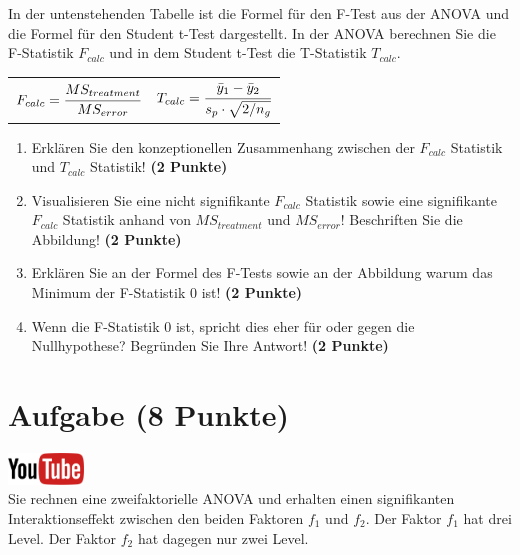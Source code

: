 \documentclass[a4paper, 9pt]{scrartcl}\usepackage[]{graphicx}\usepackage[]{xcolor}
\begin{document}
In der untenstehenden Tabelle ist die Formel f{\"u}r den F-Test aus der ANOVA
und die Formel f{\"u}r den Student t-Test dargestellt. In der ANOVA berechnen
Sie die F-Statistik $F_{calc}$ und in dem Student t-Test die T-Statistik
$T_{calc}$.

\begin{center}
  \begin{tabular}{cc}
    $F_{calc} = \cfrac{MS_{treatment}}{MS_{error}}$ & $T_{calc} = \cfrac{\bar{y}_1 - \bar{y}_2}{s_p \cdot \sqrt{2/n_g}}$\\
  \end{tabular}
\end{center}


\begin{enumerate}
\item Erkl{\"a}ren Sie den konzeptionellen Zusammenhang zwischen der $F_{calc}$
  Statistik und $T_{calc}$ Statistik! \textbf{(2 Punkte)}
\item Visualisieren Sie eine nicht signifikante $F_{calc}$ Statistik sowie
  eine signifikante $F_{calc}$ Statistik anhand von $MS_{treatment}$ und
  $MS_{error}$! Beschriften Sie die Abbildung! \textbf{(2 Punkte)}
\item Erkl{\"a}ren Sie an der Formel des F-Tests sowie an der Abbildung warum
  das Minimum der F-Statistik 0 ist! \textbf{(2 Punkte)}
\item Wenn die F-Statistik 0 ist, spricht dies eher f{\"u}r oder gegen die
  Nullhypothese? Begr{\"u}nden Sie Ihre Antwort! \textbf{(2 Punkte)}
\end{enumerate}

 
\clearpage

\section{Aufgabe \hfill (8 Punkte)}

\hfill\href{https://youtu.be/2qG1Dws0MJo}{\includegraphics[width =
  2cm]{img/youtube}}\\[1Ex]


Sie rechnen eine zweifaktorielle ANOVA und erhalten einen signifikanten
Interaktionseffekt zwischen den beiden Faktoren $f_1$ und $f_2$. Der Faktor
$f_1$ hat drei Level. Der Faktor $f_2$ hat dagegen nur zwei Level.
\end{document}

